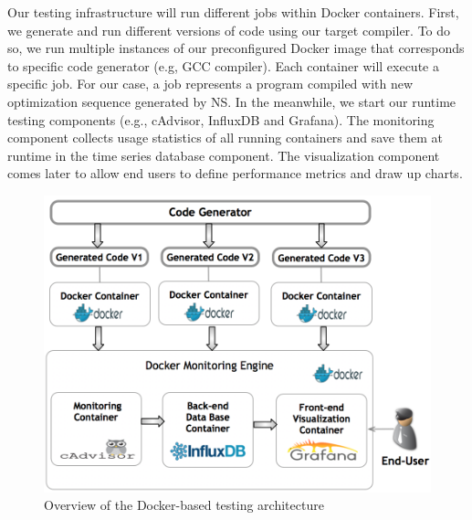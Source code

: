 Our testing infrastructure will run different jobs within Docker containers. First, we generate and run different versions of code using our target compiler. To do so, we run multiple instances of our preconfigured Docker image that corresponds to specific code generator (e.g, GCC compiler). Each container will execute a specific job. For our case, a job represents a program compiled with new optimization sequence generated by NS. In the meanwhile, we start our runtime testing components (e.g., cAdvisor, InfluxDB and Grafana). The monitoring component collects usage statistics of all running containers and save them at runtime in the time series database component. The visualization component comes later to allow end users to define performance metrics and draw up charts.
\begin{figure}[h]
	\includegraphics[width=1.\linewidth]{Ressources/infra.png}
	\caption{Overview of the Docker-based testing architecture}
\end{figure}
